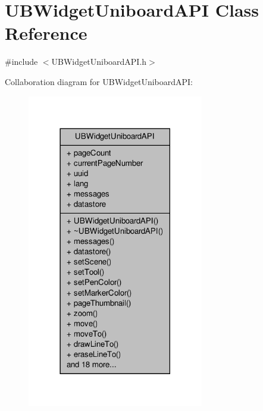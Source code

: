 \hypertarget{class_u_b_widget_uniboard_a_p_i}{\section{U\-B\-Widget\-Uniboard\-A\-P\-I Class Reference}
\label{d5/d2b/class_u_b_widget_uniboard_a_p_i}
}


{\ttfamily \#include $<$U\-B\-Widget\-Uniboard\-A\-P\-I.\-h$>$}



Collaboration diagram for U\-B\-Widget\-Uniboard\-A\-P\-I\-:
\nopagebreak
\begin{figure}[H]
\begin{center}
\leavevmode
\includegraphics[width=218pt]{de/d27/class_u_b_widget_uniboard_a_p_i__coll__graph}
\end{center}
\end{figure}
